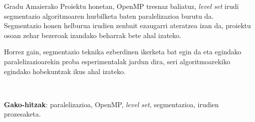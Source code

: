 
\thispagestyle{empty}


Gradu Amaierako Proiektu honetan, OpenMP tresnaz baliatuz, \textit{level set} irudi segmentazio algoritmoaren hurbilketa baten paralelizazioa burutu da. Segmentazio honen helburua irudien zenbait ezaugarri ateratzea izan da, proiektu osoan zehar bezeroak izandako beharrak bete ahal izateko. 

Horrez gain, segmentazio teknika ezberdinen ikerketa bat egin da eta egindako paralelizazioarekin proba esperimentalak jardun dira, seri algoritmoarekiko egindako hobekuntzak ikus ahal izateko. 

\

\textbf{Gako-hitzak}: paralelizazioa, OpenMP, \textit{level set}, segmentazioa, irudien prozesaketa.

\clearpage                         %
\thispagestyle{empty} \ \clearpage %
